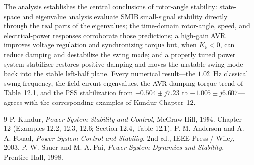 \documentclass[12pt,a4paper]{article}
\begin{document}
The analysis establishes the central conclusions of rotor-angle stability:
state-space and eigenvalue analysis evaluate SMIB small-signal stability
directly through the real parts of the eigenvalues; the time-domain rotor-angle,
speed, and electrical-power responses corroborate those predictions; a high-gain
AVR improves voltage regulation and synchronizing torque but, when $K_5<0$, can
reduce damping and destabilize the swing mode; and a properly tuned power system
stabilizer restores positive damping and moves the unstable swing mode back into
the stable left-half plane. Every numerical result---the $1.02$~Hz classical
swing frequency, the field-circuit eigenvalues, the AVR damping-torque trend of
Table~12.1, and the PSS stabilization from $+0.504\pm j7.23$ to
$-1.005\pm j6.607$---agrees with the corresponding examples of Kundur
Chapter~12.

\begin{thebibliography}{9}
 P. Kundur, \textit{Power System Stability and Control},
McGraw-Hill, 1994. Chapter 12 (Examples 12.2, 12.3, 12.6; Section 12.4,
Table 12.1).
 P. M. Anderson and A. A. Fouad, \textit{Power System Control
and Stability}, 2nd ed., IEEE Press / Wiley, 2003.
 P. W. Sauer and M. A. Pai, \textit{Power System Dynamics and
Stability}, Prentice Hall, 1998.
\end{thebibliography}
\end{document}
